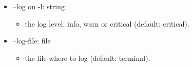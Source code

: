 \documentclass[manual-fr.tex]{subfiles}
\begin{document}
\begin{itemize}
\begin{itemize}
            \item[] --log ou -l: string
                \begin{itemize}
                    \item[] the log level: info, warn or critical (default: critical).
                \end{itemize}
            \item[] --log-file: file
                \begin{itemize}
                    \item[] the file where to log (default: terminal).
                \end{itemize}
        \end{itemize}
\end{itemize}
\end{document}
